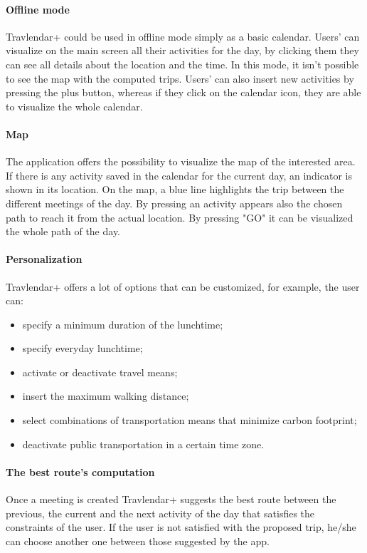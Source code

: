 \documentclass[12pt,titlepage]{article}
\begin{document}
\paragraph{Offline mode}
Travlendar+ could be used in offline mode simply as a basic calendar. Users' can visualize on the main screen all their activities for the day, by clicking them they can see all details about the location and the time. In this mode, it isn't possible to see the map with the computed trips. Users' can also insert new activities by pressing the plus button, whereas if they click on the calendar icon, they are able to visualize the whole calendar. 

\paragraph{Map}
The application offers the possibility to visualize the map of the interested area. If there is any activity saved in the calendar for the current day, an indicator is shown in its location. On the map, a blue line highlights the trip between the different meetings of the day. By pressing an activity appears also the chosen path to reach it from the actual location. By pressing "GO" it can be visualized the whole path of the day.

\paragraph{Personalization}
Travlendar+ offers a lot of options that can be customized, for example, the user can:
\begin{itemize}
\item{specify a minimum duration of the lunchtime;}
\item {specify everyday lunchtime;}
\item{activate or deactivate travel means;}
\item{insert the maximum walking distance;}
\item{select combinations of transportation means that minimize carbon footprint;}
\item{deactivate public transportation in a certain time zone.}
\end{itemize}

\paragraph{The best route's computation}
Once a meeting is created Travlendar+ suggests the best route between the previous, the current and the next activity of the day that satisfies the constraints of the user. If the user is not satisfied with the proposed trip, he/she can choose another one between those suggested by the app.
\end{document}

